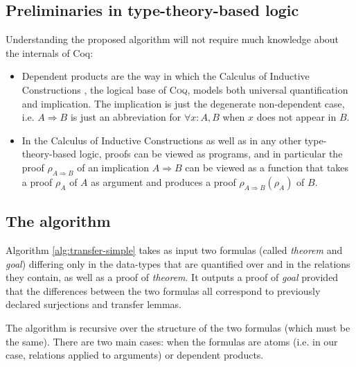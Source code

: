 \documentclass{llncs}
\begin{document}
\subsection{Preliminaries in type-theory-based logic}

Understanding the proposed algorithm will not require much knowledge about
the internals of Coq:

\begin{itemize}
\item Dependent products are the way in which the Calculus of Inductive Constructions
\cite[Ch. 4]{Coq:manual}, the logical base of \textsc{Coq},
models both universal quantification and implication. The implication is just the
degenerate non-dependent case,
i.e. $A \Rightarrow B$ is just an abbreviation for $\forall x : A, B$ when $x$ does
not appear in $B$.

\item In the Calculus of Inductive Constructions as well as in
any other type-theory-based logic,
proofs can be viewed as programs, and in particular the proof $\rho_{A \Rightarrow B}$
of an implication $A \Rightarrow B$
can be viewed as a function that takes a proof $\rho_A$ of $A$ as argument
and produces a proof $\rho_{A \Rightarrow B} (\rho_A)$ of $B$.
\end{itemize}

\subsection{The algorithm}

Algorithm \ref{alg:transfer-simple} takes as input two formulas (called \emph{theorem} and \emph{goal})
differing only in the data-types that are quantified over and in the relations they contain,
as well as a proof of \emph{theorem}.
It outputs a proof of \emph{goal} provided that the differences between the two formulas all correspond
to previously declared surjections and transfer lemmas.

The algorithm is recursive over the structure of the two formulas (which must be the same).
There are two main cases: when the formulas are atoms (i.e. in our case, relations applied
to arguments) or dependent products.
\end{document}
